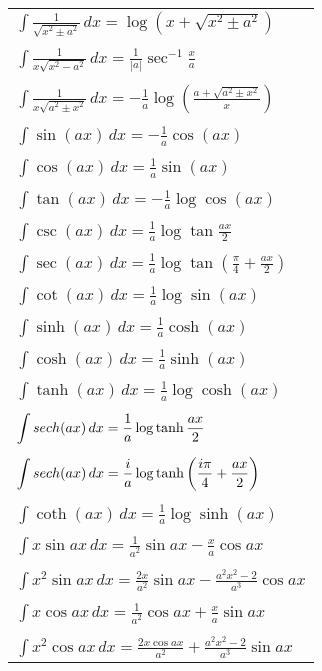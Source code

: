 \begin{longtable}{l}
  $\displaystyle \int \frac{1}{\sqrt{x^2 \pm a^2}}\,d x 
  = \log (x + \sqrt{x^2 \pm a^2})$ \\
  \\
  $\displaystyle \int \frac{1}{x \sqrt{x^2 - a^2}}\,d x 
  = \frac{1}{|a|} \sec^{-1} \frac{x}{a}$ \\
  \\
  $\displaystyle \int \frac{1}{x \sqrt{a^2 \pm x^2}}\,d x 
  = - \frac{1}{a} \log \left(
    \frac{a + \sqrt{a^2 \pm x^2}}{x} \right)$ \\
  \\
  $\displaystyle \int \sin(a x)\,d x = - \frac{1}{a} \cos (a x)$ \\
  \\
  $\displaystyle \int \cos(a x)\,d x = \frac{1}{a} \sin (a x)$ \\
  \\
  $\displaystyle \int \tan(a x)\,d x = - \frac{1}{a} \log \cos (a x)$ \\
  \\
  $\displaystyle \int \csc(a x)\,d x = \frac{1}{a} \log \tan \frac{a x}{2}$ \\
  \\
  $\displaystyle \int \sec(a x)\,d x 
  = \frac{1}{a} \log \tan \left( \frac{\pi}{4} + \frac{a x}{2}
  \right)$\\
  \\
  $\displaystyle \int \cot(a x)\,d x = \frac{1}{a} \log \sin (a x)$ \\
  \\
  $\displaystyle \int \sinh(a x)\,d x = \frac{1}{a} \cosh (a x)$ \\
  \\
  $\displaystyle \int \cosh(a x)\,d x = \frac{1}{a} \sinh (a x)$ \\
  \\
  $\displaystyle \int \tanh(a x)\,d x = \frac{1}{a} \log \cosh (a x)$ \\
  \\
  $\displaystyle \int sech(a x)\,d x = \frac{1}{a} \log \tanh \frac{a x}{2}$ \\
  \\
  $\displaystyle \int sech(a x)\,d x 
  = \frac{i}{a} \log \tanh \left( \frac{i \pi}{4} +
    \frac{a x}{2} \right)$ \\
  \\
  $\displaystyle \int \coth(a x)\,d x = \frac{1}{a} \log \sinh (a x)$ \\
  \\
  $\displaystyle \int x \sin a x\,d x 
  = \frac{1}{a^2} \sin a x - \frac{x}{a} \cos a x$ \\
  \\
  $\displaystyle \int x^2 \sin a x\,d x 
  = \frac{2x}{a^2} \sin a x - \frac{a^2 x^2-2}{a^3} \cos a x$ \\
  \\
  $\displaystyle \int x \cos a x\,d x 
  = \frac{1}{a^2} \cos a x + \frac{x}{a} \sin a x$ \\
  \\
  $\displaystyle \int x^2 \cos a x\,d x 
  = \frac{2x \cos a x}{a^2} + \frac{a^2 x^2 - 2}{a^3} \sin a x$
\end{longtable}
